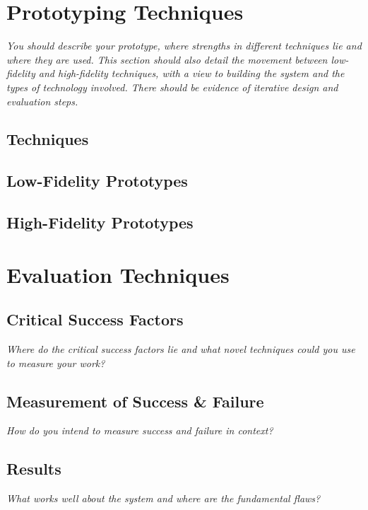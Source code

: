 \documentclass{article}
\begin{document}
\section{Prototyping Techniques}
\textit{You should describe your prototype, where strengths in different techniques lie and where they are used. This section should also detail the movement between low- fidelity and high-fidelity techniques, with a view to building the system and the types of technology involved. There should be evidence of iterative design and evaluation steps.}
\subsection{Techniques}
\subsection{Low-Fidelity Prototypes}
\subsection{High-Fidelity Prototypes}

\section{Evaluation Techniques}
\subsection{Critical Success Factors}
\textit{Where do the critical success factors lie and what novel techniques could you use to measure your work?}

\subsection{Measurement of Success \& Failure}
\textit{How do you intend to measure success and failure in context? }

\subsection{Results}
\textit{ What works well about the system and where are the fundamental flaws?}
\end{document}
